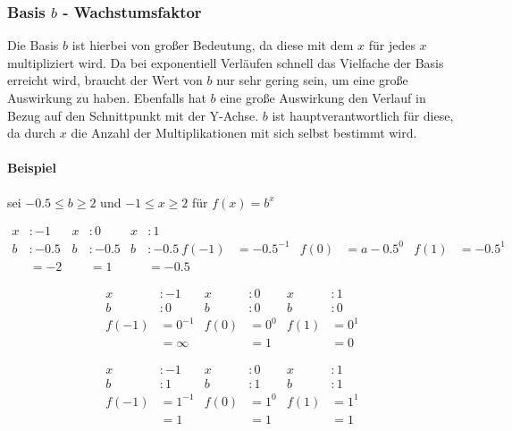   \subsubsection{Basis \mbox{\boldmath$b$} - Wachstumsfaktor } Die Basis $b$ ist hierbei von großer Bedeutung, da diese mit dem $x$ für jedes $x$ multipliziert wird. Da bei exponentiell Verläufen schnell das Vielfache der Basis erreicht wird, braucht der Wert von $b$ nur sehr gering sein, um eine große Auswirkung zu haben. Ebenfalls hat $b$ eine große Auswirkung den Verlauf in Bezug auf den Schnittpunkt mit der Y-Achse. $b$ ist hauptverantwortlich für diese, da durch $x$ die Anzahl der Multiplikationen mit sich selbst bestimmt wird. 


\paragraph{Beispiel} sei $-0.5\le b\ge 2 $ und $-1\le x\ge 2$ für $f(x)=b^x$
   	
\begin{align*} 
x&:-1           &  x &: 0              &  x &:1\\
b&:-0.5			& b&:-0.5					& b&:-0.5\
f(-1)&=-0.5^{-1}	& f(0)&=a-0.5^0	& f(1)&=-0.5^1\\  
&= -2 & &=1 & &=-0.5
\end{align*}

\begin{align*}
x&:-1           &  x &: 0              &  x &:1\\
b&:0			& b&:0					& b&:0\\
f(-1)&=0^{-1}	& f(0)&=0^0	& f(1)&=0^1\\  
&= \infty & &=1 & &=0
\end{align*}

\begin{align*}
x&:-1           &  x &: 0              &  x &:1\\
b&:1			& b&:1					& b&:1\\
f(-1)&=1^{-1}	& f(0)&=1^0	& f(1)&=1^1\\  
&=1  & &=1 & &=1
\end{align*}

